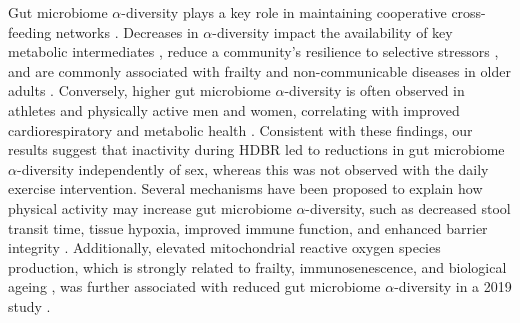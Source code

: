 \documentclass[preprint,12pt,authoryear]{elsarticle}
\begin{document}
    Gut microbiome $\alpha$-diversity plays a key role in maintaining cooperative cross-feeding networks \citep{daisleyEmergingConnectionsGut2021, coyteUnderstandingCompetitionCooperation2019}. Decreases in $\alpha$-diversity impact the availability of key metabolic intermediates \citep{daisleyEmergingConnectionsGut2021}, reduce a community's resilience to selective stressors \citep{naeemBiodiversityEnhancesEcosystem1997, yachiBiodiversityEcosystemProductivity1999, wittebolleInitialCommunityEvenness2009}, and are commonly associated with frailty and non-communicable diseases in older adults \citep{gomaaHumanGutMicrobiota2020, jacksonSignaturesEarlyFrailty2016, nagpalGutMicrobiomeAging2018, wangGutMicrobiotaInfluence2024}. Conversely, higher gut microbiome $\alpha$-diversity is often observed in athletes and physically active men and women, correlating with improved cardiorespiratory and metabolic health \citep{ortiz-alvarezInfluenceExerciseHuman2020, bartonMicrobiomeProfessionalAthletes2017, clarkeExerciseAssociatedDietary2014}. Consistent with these findings, our results suggest that inactivity during HDBR led to reductions in gut microbiome $\alpha$-diversity independently of sex, whereas this was not observed with the daily exercise intervention. Several mechanisms have been proposed to explain how physical activity may increase gut microbiome $\alpha$-diversity, such as decreased stool transit time, tissue hypoxia, improved immune function, and enhanced barrier integrity \citep{bermonMicrobiotaExerciseImmunology2015, estakiCardiorespiratoryFitnessPredictor2016, rosaHabitualExerciseProgram2005}. Additionally, elevated mitochondrial reactive oxygen species production, which is strongly related to frailty, immunosenescence, and biological ageing \citep{goRedoxTheoryAging2017, josephBeneficialEffectsExercise2016}, was further associated with reduced gut microbiome $\alpha$-diversity in a 2019 study \citep{yardeniHostMitochondriaInfluence2019}. 
    
\end{document}

